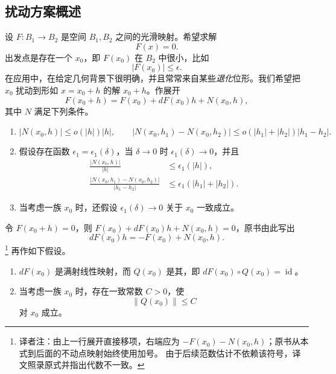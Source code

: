 \subsection{扰动方案概述}
\label{subsec:outline-perturbation-scheme}

设 $F:B_1\to B_2$ 是\personBanach{}空间 $B_1,B_2$ 之间的光滑映射。希望求解
\begin{equation}
 F(x)=0.
 \label{eq:abstract-nonlinear-equation}
\end{equation}
出发点是存在一个\termApproximateSolution{} $x_0$，即 $F(x_0)$ 在 $B_2$ 中很小，比如
\begin{equation}
 |F(x_0)|\leq\epsilon.
 \label{eq:approximate-solution-error}
\end{equation}
在应用中，\termApproximateSolution{}在给定几何背景下很明确，并且常常来自某些\emph{退化}位形。我们希望把
$x_0$ 扰动到形如 $x=x_0+h$ 的解 $x_0+h$。作\personTaylor{}展开
\[
 F(x_0+h)=F(x_0)+dF(x_0)h+N(x_0,h),
\]
其中 $N$ 满足下列条件。
\begin{enumerate}[label=(\arabic*)]
\item
\[
 |N(x_0,h)|\leq o(|h|)|h|,
 \qquad
 |N(x_0,h_1)-N(x_0,h_2)|
 \leq o(|h_1|+|h_2|)|h_1-h_2|.
\]
\item 假设存在函数 $\epsilon_1=\epsilon_1(\delta)$，当 $\delta\to0$ 时
$\epsilon_1(\delta)\to0$，并且
\begin{align}
 \frac{|N(x_0,h)|}{|h|}&\leq\epsilon_1(|h|),
 \label{eq:nonlinear-remainder-bound}\\
 \frac{|N(x_0,h_1)-N(x_0,h_2)|}{|h_1-h_2|}
 &\leq\epsilon_1(|h_1|+|h_2|).
 \label{eq:nonlinear-remainder-lipschitz}
\end{align}
\item 当考虑一族\termApproximateSolution{} $x_0$ 时，还假设
$\epsilon_1(\delta)\to0$ 关于 $x_0$ 一致成立。
\end{enumerate}
令 $F(x_0+h)=0$，则
$F(x_0)+dF(x_0)h+N(x_0,h)=0$，原书由此写出
\begin{equation}
 dF(x_0)h=-F(x_0)+N(x_0,h).
 \label{eq:abstract-linearized-correction}
\end{equation}
\footnote{译者注：由上一行\personTaylor{}展开直接移项，右端应为
$-F(x_0)-N(x_0,h)$；原书从本式到后面的不动点映射始终使用加号。
由于后续范数估计不依赖该符号，译文照录原式并指出代数不一致。}
再作如下假设。
\begin{enumerate}[label=(\arabic*),start=4]
\item $dF(x_0)$ 是满射线性映射，而 $Q(x_0)$ 是其\termRightInverse{}，即
$dF(x_0)\circ Q(x_0)=\operatorname{id}$。
\item 当考虑一族\termApproximateSolution{} $x_0$ 时，存在一致常数 $C>0$，使
\begin{equation}
 \|Q(x_0)\|\leq C
 \label{eq:uniform-right-inverse-abstract}
\end{equation}
对 $x_0$ 成立。
\end{enumerate}

